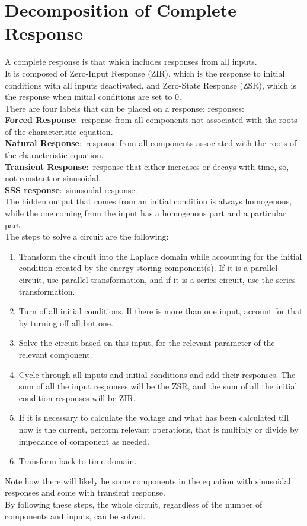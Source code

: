 \documentclass[nobib]{tufte-handout}
\newcommand{\defn}[2]{\noindent\textbf{#1}:\ #2}
\begin{document}
\section{Decomposition of Complete Response}
A complete response is that which includes responses from all inputs.\\ It is
composed of Zero-Input Response (ZIR), which is the response to initial
conditions with all inputs deactivated, and Zero-State Response (ZSR), which is
the response when initial conditions are set to 0.\\ There are four labels that
can be placed on a response: responses:\\ \defn{Forced Response}{response from
    all components not associated with the roots of the characteristic equation.}\\
\defn{Natural Response}{response from all components associated with the roots
    of the characteristic equation.}\\ \defn{Transient Response}{response that
    either increases or decays with time, so, not constant or sinusoidal.}\\
\defn{SSS response}{sinusoidal response.}\\ The hidden output that comes from
an initial condition is always homogenous, while the one coming from the input
has a homogenous part and a particular part.\\ The steps to solve a circuit are
the following:\\
\begin{enumerate}
    \item Transform the circuit into the Laplace domain while accounting for the initial
          condition created by the energy storing component(s). If it is a parallel
          circuit, use parallel transformation, and if it is a series circuit, use the
          series transformation.
    \item Turn of all initial conditions. If there is more than one input, account for
          that by turning off all but one.
    \item Solve the circuit based on this input, for the relevant parameter of the
          relevant component.
    \item Cycle through all inputs and initial conditions and add their responses. The
          sum of all the input responses will be the ZSR, and the sum of all the initial
          condition responses will be ZIR.
    \item If it is necessary to calculate the voltage and what has been calculated till
          now is the current, perform relevant operations, that is multiply or divide by
          impedance of component as needed.
    \item Transform back to time domain.
\end{enumerate}
Note how there will likely be some components in the equation with sinusoidal responses and some with transient response.\\
By following these steps, the whole circuit, regardless of the number of components and inputs, can be solved.\\
\end{document}
